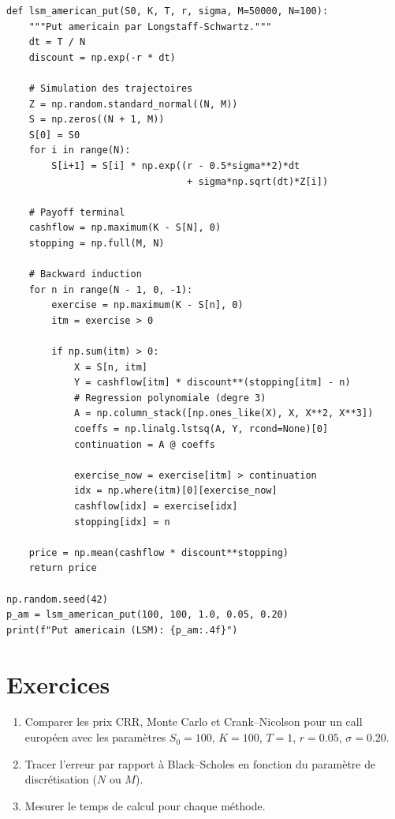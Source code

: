 \begin{codeblock}[title=\textbf{Longstaff--Schwartz pour put am\'ericain}]
\begin{verbatim}
def lsm_american_put(S0, K, T, r, sigma, M=50000, N=100):
    """Put americain par Longstaff-Schwartz."""
    dt = T / N
    discount = np.exp(-r * dt)

    # Simulation des trajectoires
    Z = np.random.standard_normal((N, M))
    S = np.zeros((N + 1, M))
    S[0] = S0
    for i in range(N):
        S[i+1] = S[i] * np.exp((r - 0.5*sigma**2)*dt
                                + sigma*np.sqrt(dt)*Z[i])

    # Payoff terminal
    cashflow = np.maximum(K - S[N], 0)
    stopping = np.full(M, N)

    # Backward induction
    for n in range(N - 1, 0, -1):
        exercise = np.maximum(K - S[n], 0)
        itm = exercise > 0

        if np.sum(itm) > 0:
            X = S[n, itm]
            Y = cashflow[itm] * discount**(stopping[itm] - n)
            # Regression polynomiale (degre 3)
            A = np.column_stack([np.ones_like(X), X, X**2, X**3])
            coeffs = np.linalg.lstsq(A, Y, rcond=None)[0]
            continuation = A @ coeffs

            exercise_now = exercise[itm] > continuation
            idx = np.where(itm)[0][exercise_now]
            cashflow[idx] = exercise[idx]
            stopping[idx] = n

    price = np.mean(cashflow * discount**stopping)
    return price

np.random.seed(42)
p_am = lsm_american_put(100, 100, 1.0, 0.05, 0.20)
print(f"Put americain (LSM): {p_am:.4f}")
\end{verbatim}
\end{codeblock}

\section{Exercices}

\begin{exercice}
\begin{enumerate}
    \item Comparer les prix CRR, Monte Carlo et Crank--Nicolson pour un
          call europ\'een avec les param\`etres $S_0=100$, $K=100$, $T=1$,
          $r=0.05$, $\sigma=0.20$.
    \item Tracer l'erreur par rapport \`a Black--Scholes en fonction du
          param\`etre de discr\'etisation ($N$ ou $M$).
    \item Mesurer le temps de calcul pour chaque m\'ethode.
\end{enumerate}
\end{exercice}

